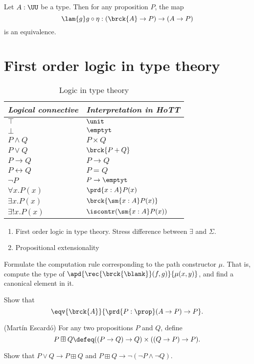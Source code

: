 \begin{thm}
Let $A:\UU$ be a type. Then for any proposition $P$, the map
\begin{equation*}
\lam{g} g\circ \eta : (\brck{A}\to P)\to (A\to P)
\end{equation*}
is an equivalence.
\end{thm}

\section{First order logic in type theory}
\begin{table}
\caption{Logic in type theory}
\begin{center}
\begin{tabular}{ll}
\toprule
\emph{Logical connective} & \emph{Interpretation in HoTT} \\
\midrule
$\top$ & $\unit$ \\
$\bot$ & $\emptyt$ \\
$P\land Q$ & $P\times Q$ \\
$P\lor Q$ & $\brck{P+Q}$ \\
$P\to Q$ & $P\to Q$ \\
$P\leftrightarrow Q$ & $P=Q$ \\
$\neg P$ & $P\to\emptyt$ \\
$\forall x.P(x)$ & $\prd{x:A}P(x)$ \\
$\exists x.P(x)$ & $\brck{\sm{x:A}P(x)}$ \\
$\exists! x.P(x)$ & $\iscontr(\sm{x:A}P(x))$ \\
\bottomrule
\end{tabular}
\end{center}
\end{table}
\begin{enumerate}
\item First order logic in type theory. Stress difference between $\exists$ and $\Sigma$.
\item Propositional extensionality
\end{enumerate}

\begin{exercises}
\item \label{ex:brck_comp} Formulate the computation rule corresponding to the path constructor $\mu$. That is, compute the type of $\apd{\rec{\brck{\blank}}(f,g)}{\mu(x,y)}$, and find a canonical element in it.
\item Show that
\begin{equation*}
\eqv{\brck{A}}{\prd{P:\prop}(A\to P)\to P}.
\end{equation*}
\item \label{also}(Mart\'in Escard\'o) For any two propositions $P$ and $Q$, define
\begin{equation*}
P\boxplus Q \defeq ((P\to Q)\to Q)\times ((Q\to P)\to P).
\end{equation*}
\begin{subexenum}
\item Show that $P\lor Q\to P\boxplus Q$ and $P\boxplus Q\to\neg(\neg P\land \neg Q)$.
\end{subexenum}
\end{exercises}
